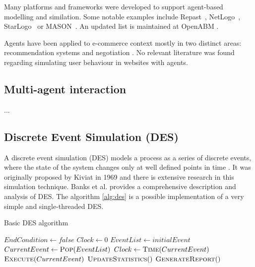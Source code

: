 Many platforms and frameworks were developed to support agent-based modelling 
and similation. Some notable examples include Repast~\cite{collier2003repast}, 
NetLogo~\cite{wilensky1999netlogo}, StarLogo~\cite{resnick1996starlogo} or 
MASON~\cite{panait2005cooperative}. An updated list is maintained at OpenABM 
\cite{OpenABM2016}.

Agents have been applied to e-commerce context mostly in two distinct areas: 
recommendation systems \cite{xiao2007commerce, walter2008model} and negotiation 
\cite{rahwan2002intelligent, maes1999agents}. No relevant literature was found 
regarding simulating user behaviour in websites with agents.

\subsection{Multi-agent interaction}

...

\subsection{Discrete Event Simulation (DES)}

A discrete event simulation (DES) models a process as a series of discrete 
events, where the state of the system changes only at well defined points in 
time \cite{Siebers2010}. It was originally proposed by Kiviat in 1969 
\cite{Kiviat1969} and there is extensive research in this simulation technique. 
Banks et al. \cite{Banks2004} provides a comprehensive description and analysis 
of DES. The algorithm \ref{alg:des} is a possible implementation of a very 
simple and single-threaded DES.

\begin{algorithm}[h]
    \caption{Basic DES algorithm}
    \label{alg:des}
    \begin{algorithmic}
        \State $EndCondition \gets false$
        \State $Clock \gets 0$
        \State $EventList \gets initialEvent$
        \State $CurrentEvent \gets \Call{Pop}{EventList}$
        \State $Clock \gets \Call{Time}{CurrentEvent}$
        \State $\Call{Execute}{CurrentEvent}$ 
        \State $\Call{UpdateStatistics}$
        \EndWhile
        \State $\Call{GenerateReport}$
    \end{algorithmic}
\end{algorithm}

